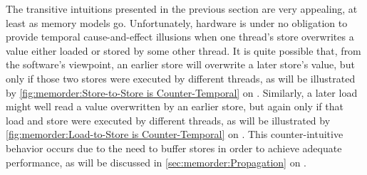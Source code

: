 The transitive intuitions presented in the previous section are
very appealing, at least as memory models go.
Unfortunately, hardware is under no obligation to provide temporal
cause-and-effect illusions when one thread's store overwrites a value either
loaded or stored by some other thread.
It is quite possible that, from the software's viewpoint, an earlier store
will overwrite a later store's value, but only if those two stores were
executed by different threads, as will be illustrated by
\cref{fig:memorder:Store-to-Store is Counter-Temporal}
on
.
Similarly, a later load might well read a value overwritten by an
earlier store, but again only if that load and store were executed by
different threads, as will be illustrated by
\cref{fig:memorder:Load-to-Store is Counter-Temporal}
on
.
This counter-intuitive behavior occurs due to the need to buffer
stores in order to achieve adequate performance, as will be discussed in
\cref{sec:memorder:Propagation}
on
.

